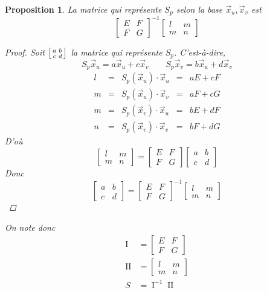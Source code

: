 \documentclass{report}
\newtheorem*{prop}{Proposition}
\theoremstyle{definition}
\theoremstyle{remark}
\def\pff{\operatorname{I}}
\def\dff{\operatorname{II}}
\begin{document}
	\begin{prop}
		La matrice qui repr\'esente $S_p$ selon la base $\vec x_u,\vec x_v$ est \[ \begin{bmatrix}
			E&F\\F&G
		\end{bmatrix}^{-1} \begin{bmatrix}
			l&m\\m&n
		\end{bmatrix} \]

		\begin{proof}
			Soit $\begin{bsmallmatrix}
				a&b\\c&d
			\end{bsmallmatrix}$ la matrice qui repr\'esente $S_p$. C'est-\`a-dire, \[ S_p\vec x_u = a\vec x_u+c\vec x_v \qquad S_p\vec x_v = b\vec x_u+d\vec x_v \]
			\[ \begin{array}{lclcl}
				l&=&S_p(\vec x_u)\cdot\vec x_u&=&aE+cF\\
				m&=&S_p(\vec x_u)\cdot\vec x_v&=&aF+cG\\
				m&=&S_p(\vec x_v)\cdot\vec x_u&=&bE+dF\\
				n&=&S_p(\vec x_v)\cdot\vec x_v&=&bF+dG
			\end{array} \]
			D'o\`u
			\[ \begin{bmatrix}
				l&m\\m&n
			\end{bmatrix} = \begin{bmatrix}
				E&F\\F&G
			\end{bmatrix} \begin{bmatrix}
				a&b\\c&d
			\end{bmatrix} \]
			Donc
			\[ \begin{bmatrix}
				a&b\\c&d
			\end{bmatrix} = \begin{bmatrix}
				E&F\\F&G
			\end{bmatrix}^{-1} \begin{bmatrix}
				l&m\\m&n
			\end{bmatrix} \]
		\end{proof}

		On note donc
		\begin{align*}
			\pff&= \begin{bmatrix}
				E&F\\F&G
			\end{bmatrix}\\
			\dff&= \begin{bmatrix}
				l&m\\m&n
			\end{bmatrix}\\
			S&= \pff^{-1}\dff
		\end{align*}
	\end{prop}
\end{document}
